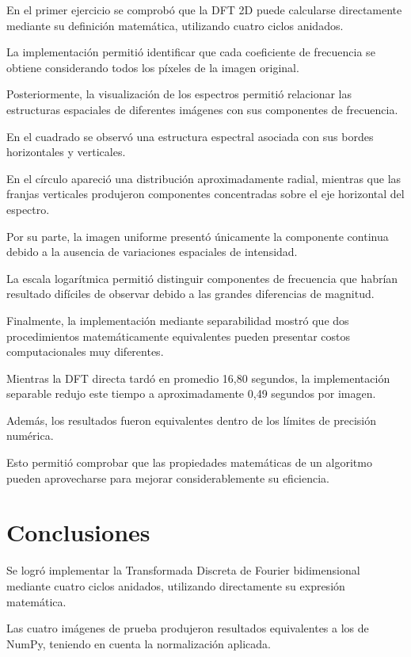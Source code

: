 \documentclass[11pt,letterpaper]{article}
\begin{document}
En el primer ejercicio se comprobó que
la DFT 2D puede calcularse directamente
mediante su definición matemática,
utilizando cuatro ciclos anidados.

La implementación permitió identificar
que cada coeficiente de frecuencia
se obtiene considerando todos los píxeles
de la imagen original.

Posteriormente, la visualización de los
espectros permitió relacionar las estructuras
espaciales de diferentes imágenes
con sus componentes de frecuencia.

En el cuadrado se observó una estructura
espectral asociada con sus bordes
horizontales y verticales.

En el círculo apareció una distribución
aproximadamente radial, mientras que
las franjas verticales produjeron
componentes concentradas sobre
el eje horizontal del espectro.

Por su parte, la imagen uniforme
presentó únicamente la componente
continua debido a la ausencia de
variaciones espaciales de intensidad.

La escala logarítmica permitió distinguir
componentes de frecuencia que habrían
resultado difíciles de observar debido
a las grandes diferencias de magnitud.

Finalmente, la implementación mediante
separabilidad mostró que dos procedimientos
matemáticamente equivalentes pueden presentar
costos computacionales muy diferentes.

Mientras la DFT directa tardó en promedio
16,80 segundos, la implementación separable
redujo este tiempo a aproximadamente
0,49 segundos por imagen.

Además, los resultados fueron equivalentes
dentro de los límites de precisión numérica.

Esto permitió comprobar que las propiedades
matemáticas de un algoritmo pueden aprovecharse
para mejorar considerablemente su eficiencia.

\section{Conclusiones}

Se logró implementar la Transformada Discreta
de Fourier bidimensional mediante cuatro ciclos
anidados, utilizando directamente su expresión
matemática.

Las cuatro imágenes de prueba produjeron
resultados equivalentes a los de NumPy,
teniendo en cuenta la normalización aplicada.
\end{document}
